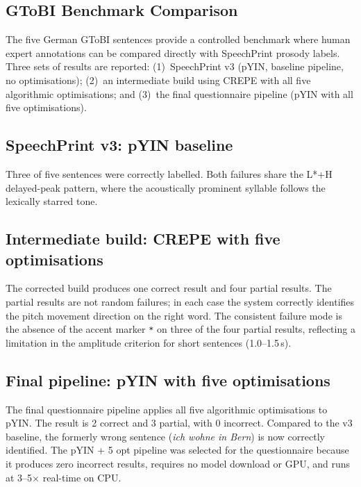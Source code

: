 \subsection{GToBI Benchmark Comparison}
\label{sec:gtobi_results}

The five German GToBI sentences provide a controlled benchmark where human expert annotations can be compared directly with SpeechPrint prosody labels. Three sets of results are reported: (1)~SpeechPrint v3 (pYIN, baseline pipeline, no optimisations); (2)~an intermediate build using CREPE with all five algorithmic optimisations; and (3)~the final questionnaire pipeline (pYIN with all five optimisations).

\subsection{SpeechPrint v3: pYIN baseline}

Three of five sentences were correctly labelled. Both failures share the L*+H delayed-peak pattern, where the acoustically prominent syllable follows the lexically starred tone.

\subsection{Intermediate build: CREPE with five optimisations}

The corrected build produces one correct result and four partial results. The partial results are not random failures; in each case the system correctly identifies the pitch movement direction on the right word. The consistent failure mode is the absence of the accent marker \texttt{*} on three of the four partial results, reflecting a limitation in the amplitude criterion for short sentences (1.0--1.5\,s).

\subsection{Final pipeline: pYIN with five optimisations}
\label{sec:gtobi_pyin_final}

The final questionnaire pipeline applies all five algorithmic optimisations to pYIN. The result is 2 correct and 3 partial, with 0 incorrect. Compared to the v3 baseline, the formerly wrong sentence (\textit{ich wohne in Bern}) is now correctly identified. The pYIN + 5 opt pipeline was selected for the questionnaire because it produces zero incorrect results, requires no model download or GPU, and runs at 3--5$\times$ real-time on CPU.

